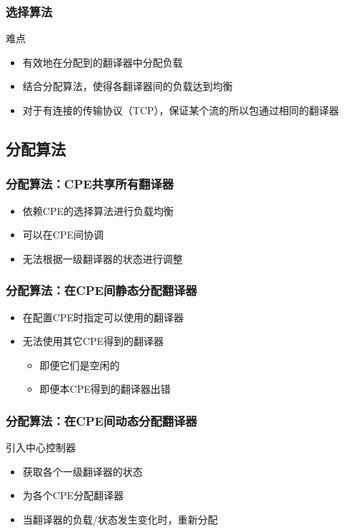 \documentclass{beamer}
\begin{document}
\begin{frame}
  \frametitle{选择算法}
  \begin{block}{难点}
    \begin{itemize}
    \item 有效地在分配到的翻译器中分配负载
    \item 结合分配算法，使得各翻译器间的负载达到均衡
    \item 对于有连接的传输协议（TCP），保证某个流的所以包通过相同的翻译器
    \end{itemize}
  \end{block}
\end{frame}

\subsection{分配算法}

\begin{frame}
  \frametitle{分配算法：CPE共享所有翻译器}
  \begin{itemize}
  \item 依赖CPE的选择算法进行负载均衡
  \item 可以在CPE间协调
  \item 无法根据一级翻译器的状态进行调整
  \end{itemize}
\end{frame}

\begin{frame}
  \frametitle{分配算法：在CPE间静态分配翻译器}
  \begin{itemize}
  \item 在配置CPE时指定可以使用的翻译器
  \item 无法使用其它CPE得到的翻译器
    \begin{itemize}
    \item 即便它们是空闲的
    \item 即便本CPE得到的翻译器出错
    \end{itemize}
  \end{itemize}
\end{frame}

\begin{frame}
  \frametitle{分配算法：在CPE间动态分配翻译器}
  \begin{block}{引入中心控制器}
    \begin{itemize}
    \item 获取各个一级翻译器的状态
    \item 为各个CPE分配翻译器
    \item 当翻译器的负载/状态发生变化时，重新分配
    \end{itemize}
  \end{block}
\end{frame}
\end{document}
